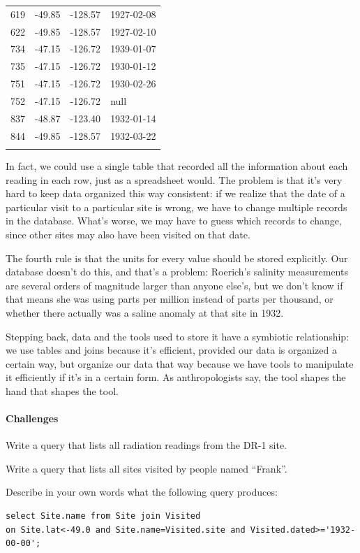 \documentclass{book}
\begin{document}
\begin{tabular}{@{}llll@{}}
\hline\noalign{\medskip}
619 & -49.85 & -128.57 & 1927-02-08
\\\noalign{\medskip}
622 & -49.85 & -128.57 & 1927-02-10
\\\noalign{\medskip}
734 & -47.15 & -126.72 & 1939-01-07
\\\noalign{\medskip}
735 & -47.15 & -126.72 & 1930-01-12
\\\noalign{\medskip}
751 & -47.15 & -126.72 & 1930-02-26
\\\noalign{\medskip}
752 & -47.15 & -126.72 & null
\\\noalign{\medskip}
837 & -48.87 & -123.40 & 1932-01-14
\\\noalign{\medskip}
844 & -49.85 & -128.57 & 1932-03-22
\\\noalign{\medskip}
\hline
\end{tabular}

In fact, we could use a single table that recorded all the information
about each reading in each row, just as a spreadsheet would. The problem
is that it's very hard to keep data organized this way consistent: if we
realize that the date of a particular visit to a particular site is
wrong, we have to change multiple records in the database. What's worse,
we may have to guess which records to change, since other sites may also
have been visited on that date.

The fourth rule is that the units for every value should be stored
explicitly. Our database doesn't do this, and that's a problem:
Roerich's salinity measurements are several orders of magnitude larger
than anyone else's, but we don't know if that means she was using parts
per million instead of parts per thousand, or whether there actually was
a saline anomaly at that site in 1932.

Stepping back, data and the tools used to store it have a symbiotic
relationship: we use tables and joins because it's efficient, provided
our data is organized a certain way, but organize our data that way
because we have tools to manipulate it efficiently if it's in a certain
form. As anthropologists say, the tool shapes the hand that shapes the
tool.

\mbox{}\paragraph{Challenges}

\begin{swcenumerate}
\item
  Write a query that lists all radiation readings from the DR-1 site.
\item
  Write a query that lists all sites visited by people named ``Frank''.
\item
  Describe in your own words what the following query produces:

\begin{verbatim}
select Site.name from Site join Visited
on Site.lat<-49.0 and Site.name=Visited.site and Visited.dated>='1932-00-00';
\end{verbatim}
\end{swcenumerate}
\end{document}
